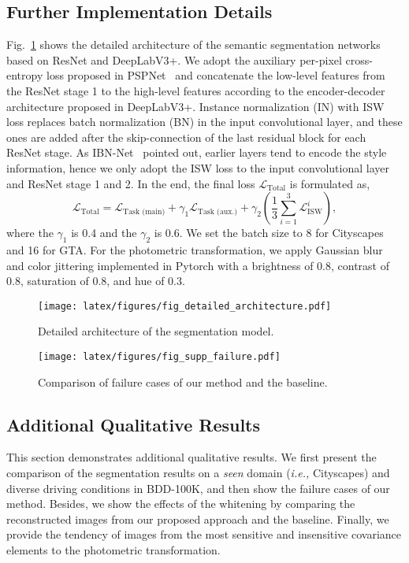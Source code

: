 \documentclass[final]{latex/cvpr}
\begin{document}
\subsection{Further Implementation Details}
\vspace*{-0.0cm}
Fig.~\ref{fig:supp_detailed} shows the detailed architecture of the semantic segmentation networks based on ResNet and DeepLabV3+. We adopt the auxiliary per-pixel cross-entropy loss proposed in PSPNet~\cite{zhao2017pyramid} and concatenate the low-level features from the ResNet stage 1 to the high-level features according to the encoder-decoder architecture proposed in DeepLabV3+. Instance normalization (IN) with ISW loss replaces batch normalization (BN) 
in the input convolutional layer, and these ones are added after the skip-connection of the last residual block for each ResNet stage.
As IBN-Net~\cite{pan2018two} pointed out, earlier layers tend to encode the style information, hence we only adopt the ISW loss to the input convolutional layer and ResNet stage 1 and 2. In the end, the final loss $\mathcal{L}_{\text{Total}}$ is formulated as,
$$\mathcal{L}_{\text{Total}} = \mathcal{L}_{\text{Task (main)}} + \gamma_1\mathcal{L}_{\text{Task (aux.)}} + \gamma_2(\frac{1}{3}\sum_{i=1}^3\mathcal{L}_{\text{ISW}}^i),$$
where the $\gamma_1$ is 0.4 and the $\gamma_2$ is 0.6. We set the batch size to 8 for Cityscapes and 16 for GTA. For the photometric transformation, we apply Gaussian blur and color jittering implemented in Pytorch with a brightness of 0.8, contrast of 0.8, saturation of 0.8, and hue of 0.3.
\begin{figure}[h!]
\vspace*{-0.1cm}
\centering
  \texttt{[image: latex/figures/fig\_detailed\_architecture.pdf]}
  \vspace*{-0.2cm}
  \caption{Detailed architecture of the segmentation model.}
\label{fig:supp_detailed}
\vspace*{-0.3cm}
\end{figure}

\begin{figure*}[!b]
\vspace*{-0.2cm}
\centering
  \texttt{[image: latex/figures/fig\_supp\_failure.pdf]}
\caption{Comparison of failure cases of our method and the baseline.}
\label{fig:supp_failure_results}
\end{figure*}

\subsection{Additional Qualitative Results}
\vspace*{-0.1cm}
This section demonstrates additional qualitative results. We first present the comparison of the segmentation results on a \emph{seen} domain (\textit{i.e.,} Cityscapes) and diverse driving conditions in BDD-100K, and then show the failure cases of our method. Besides, we show the effects of the whitening by comparing the reconstructed images from our proposed approach and the baseline. Finally, we provide the tendency of images from the most sensitive and insensitive covariance elements to the photometric transformation.
\end{document}
